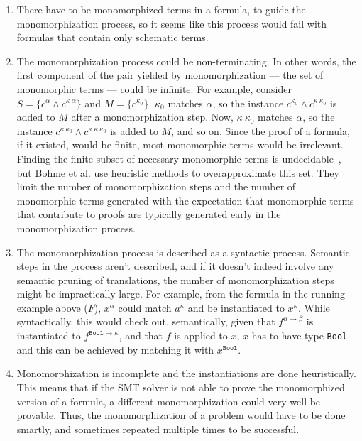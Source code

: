 \documentclass[11pt]{article}
\begin{document}
	\begin{enumerate}
		\item There have to be monomorphized 
		terms in a formula, to guide the 
		monomorphization process, so it 
		seems like this process would 
		fail with formulas that contain 
		only schematic terms. 
		\item The monomorphization process 
		could be non-terminating. In 
		other words, the first component
		of the pair yielded by 
		monomorphization --- the 
		set of monomorphic terms ---
		could be infinite. For example,
		consider $S = \{c^{\alpha}
		\land c^{\kappa\ \alpha}\}$
		and $M = \{c^{\kappa_0}\}$.
		$\kappa_0$ matches 
		$\alpha$, so the instance
		$c^{\kappa_0} \land 
		c^{\kappa\ \kappa_0}$ is added 
		to $M$ after a monomorphization 
		step. Now, $\kappa\ \kappa_0$
		matches $\alpha$, so the 
		instance $c^{\kappa\ \kappa_0} 
		\land c^{\kappa\ \kappa\ 
			\kappa_0}$ is added to $M$, 
		and so on. Since the proof of a 
		formula, if it existed, would 
		be finite, most monomorphic 
		terms would be irrelevant. 
		Finding the finite subset of 
		necessary monomorphic terms is 
		undecidable~\cite{10.1007/978-3-642-24364-6_7},
		but Bohme et al. use heuristic
		methods to overapproximate
		this set. They limit the 
		number of monomorphization 
		steps and the number of 
		monomorphic terms generated
		with the expectation that 
		monomorphic terms that 
		contribute to proofs 
		are typically generated early 
		in the monomorphization process.
		\item The monomorphization process
		is described as a syntactic 
		process. Semantic steps in 
		the process aren't described, 
		and if it doesn't indeed 
		involve	any semantic pruning of 
		translations, the number of 
		monomorphization steps 
		might be impractically large. 
		For example, from the formula 
		in the running example above ($F$), 
		$x^{\alpha}$ could match 
		$a^{\kappa}$ and be instantiated 
		to $x^{\kappa}$. While 
		syntactically, this would 
		check out, semantically, 
		given that $f^{\alpha \to \beta}$
		is instantiated to 
		$f^{\texttt{Bool} \to \kappa}$, 
		and that $f$ is applied to $x$, 
		$x$ has to have type 
		\texttt{Bool} and this can be 
		achieved by matching it with 
		$x^{\texttt{Bool}}$.
		\item Monomorphization is 
		incomplete and the instantiations 
		are done heuristically. This 
		means that if the SMT solver 
		is not able to prove the 
		monomorphized version of a 
		formula, a different 
		monomorphization could 
		very well be provable. Thus, 
		the monomorphization of a 
		problem would have to be 
		done smartly, and sometimes
		repeated multiple times to 
		be successful. 
	\end{enumerate} 
	
\end{document}

